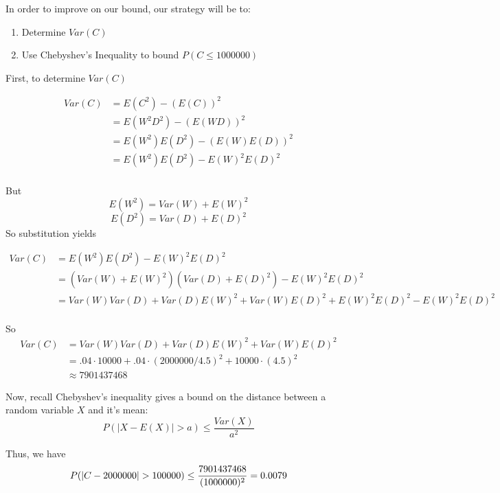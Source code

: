 \documentclass[paper=a4, fontsize=11pt]{scrartcl} %
\numberwithin{equation}{section} %
\numberwithin{figure}{section} %
\numberwithin{table}{section} %
\begin{document}
In order to improve on our bound, our strategy will be to:
\begin{enumerate}
   \item Determine $Var(C)$
   \item Use Chebyshev's Inequality to bound $P(C \leq 1000000)$
\end{enumerate}

First, to determine $Var(C)$

\begin{align*}
Var(C) &= E(C^2) - (E(C))^2 \\ 
   &= E(W^2D^2) - (E(WD))^2 \\ 
   &= E(W^2)E(D^2) - (E(W)E(D))^2\\
   &= E(W^2)E(D^2) - E(W)^2E(D)^2\\
\end{align*}

But
\begin{equation*}
E(W^2) = Var(W) + E(W)^2
\end{equation*}
\begin{equation*}
E(D^2) = Var(D) + E(D)^2
\end{equation*}
So substitution yields

\begin{align*}
Var(C) &= E(W^2)E(D^2) - E(W)^2E(D)^2\\
   &= (Var(W) + E(W)^2)(Var(D) + E(D)^2) - E(W)^2E(D)^2\\
   &= Var(W)Var(D) + Var(D)E(W)^2 + Var(W)E(D)^2 + E(W)^2E(D)^2 - E(W)^2E(D)^2\\
\end{align*}

So
\begin{align*}
Var(C) &= Var(W)Var(D) + Var(D)E(W)^2 + Var(W)E(D)^2\\
   &= .04 \cdot 10000 + .04 \cdot (2000000/4.5)^2 + 10000 \cdot(4.5)^2\\
   &\approx 7901437468
\end{align*}

Now, recall Chebyshev's inequality gives a bound on the distance between a random variable $X$ and it's mean:
\begin{equation*}
P( | X - E(X) | > a ) \leq \frac{Var(X)}{a^2}
\end{equation*}

Thus, we have
\begin{equation*}
P( | C - 2000000| > 100000) \leq \frac{7901437468}{(1000000)^2} = 0.0079 \\
\end{equation*}
\end{document}
